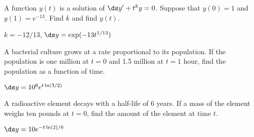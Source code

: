 \begin{enumialphparenastyle}
\begin{ex}
 A function $y(t)$ is a solution of $\ds y' +
t^ky=0$. Suppose that $y(0)=1$ and $y(1)=e^{-13}$. Find $k$ and find
$y(t)$. 
\begin{sol}
 $k=-12/13$, $\ds y=\exp(-13 t^{1/13})$
\end{sol}
\end{ex}


\begin{ex}
 A bacterial culture grows at a rate proportional to its
population. If the population is one million at $t=0$ and 1.5
million at $t=1$ hour, find the population as a function of time.
\begin{sol}
 $\ds y=10^6e^{t\ln(3/2)}$
\end{sol}
\end{ex}


\begin{ex}
 A radioactive element decays with a half-life of 6 years. If
a mass of the element weighs ten pounds at $t=0$, find the amount of
the element at time $t$.
\begin{sol}
 $\ds y=10e^{-t\ln(2)/6}$
\end{sol}
\end{ex}

\end{enumialphparenastyle}